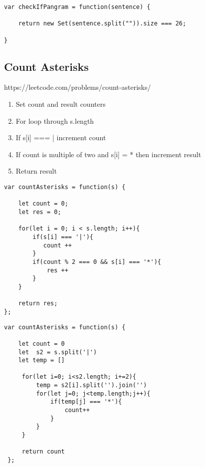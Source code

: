 \documentclass[10pt]{article}
\begin{document}
\begin{lstlisting}[title=Solution checkIfPangram, captionpos=t]
var checkIfPangram = function(sentence) {
    
    return new Set(sentence.split("")).size === 26;
    
}
\end{lstlisting}
\medskip %


\pagebreak %
\medskip 
\subsection{Count Asterisks}
https://leetcode.com/problems/count-asterisks/

\begin{enumerate}
	\item Set count and result counters
	\item For loop through s.length
	\item If s[i] === | increment count
	\item If count is multiple of two and s[i] = * then increment result
	\item Return result
\end{enumerate}

\begin{lstlisting}[title=Solution countAsterisks, captionpos=t]
var countAsterisks = function(s) {
    
    let count = 0;
    let res = 0;
    
    for(let i = 0; i < s.length; i++){
        if(s[i] === '|'){
           count ++
        }
        if(count % 2 === 0 && s[i] === '*'){
            res ++
        }
    }
    
    return res;
};
\end{lstlisting}

\begin{lstlisting}[title=My messy solution while learning, captionpos=t]
var countAsterisks = function(s) {
    
    let count = 0
    let  s2 = s.split('|')
    let temp = []
     
     for(let i=0; i<s2.length; i+=2){
         temp = s2[i].split('').join('')
         for(let j=0; j<temp.length;j++){
             if(temp[j] === '*'){
                 count++
             }
         }
     }
     
     return count
 };
\end{lstlisting}
\medskip %
\end{document}
